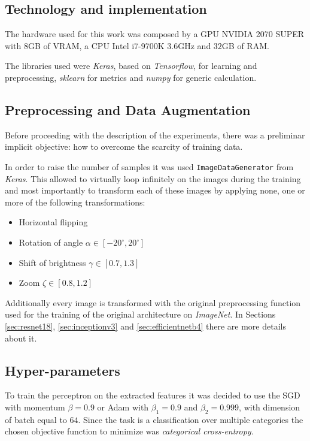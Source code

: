 \subsection{Technology and implementation}\label{sec:tech}
The hardware used for this work was composed by a GPU NVIDIA 2070 SUPER with 8GB of VRAM, a CPU Intel i7-9700K $3.6$GHz and $32$GB of RAM. \par
The libraries used were \textit{Keras}, based on \textit{Tensorflow}, for learning and preprocessing, \textit{sklearn} for metrics and \textit{numpy}  for generic calculation.

\subsection{Preprocessing and Data Augmentation}
Before proceeding with the description of the experiments, there was a preliminar implicit objective: how to overcome the scarcity of training data.\par
In order to raise the number of samples it was used \texttt{ImageDataGenerator} from \textit{Keras}. This allowed to virtually loop infinitely on the images during the training and most importantly to transform each of these images by applying none, one or more of the following transformations:
\begin{itemize}
\item{Horizontal flipping}
\item{Rotation of angle $\alpha \in [-20^{\circ}, 20^{\circ}]$}
\item{Shift of brightness $\gamma \in [0.7, 1.3]$}
\item{Zoom  $\zeta \in [0.8, 1.2]$}
\end{itemize}
Additionally every image is transformed with the original preprocessing function used for the training of the original architecture on \textit{ImageNet}. In Sections \ref{sec:resnet18}, \ref{sec:inceptionv3} and \ref{sec:efficientnetb4} there are more details about it.


\subsection{Hyper-parameters}
To train the perceptron on the extracted features it was decided to use the SGD \cite{kiefer1952} with momentum $\beta = 0.9$ or Adam \cite{kingma2014adam} with $\beta_1 = 0.9$ and $\beta_2 = 0.999$, with dimension of
batch equal to $64$.
Since the task is a classification over multiple categories the chosen objective function to minimize was \emph{categorical cross-entropy}. \par

